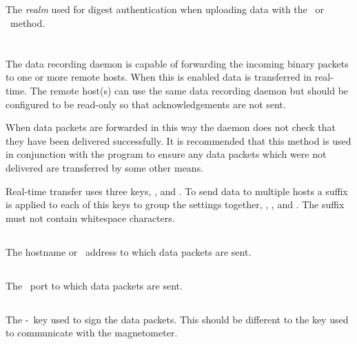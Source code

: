 \subsection{}
The \emph{realm} used for digest authentication when uploading data
with the \http\ or \https\ method.

\section{}

The data recording daemon is capable of forwarding the incoming binary
packets to one or more remote hosts. When this is enabled data is
transferred in real-time. The remote host(s) can use the same data
recording daemon but should be configured to be read-only so that
acknowledgements are not sent.

When data packets are forwarded in this way the daemon does not check
that they have been delivered successfully. It is recommended that
this method is used in conjunction with the 
program to ensure any data packets which were not delivered are
transferred by some other means.

Real-time transfer uses three keys, ,
 and . To send data to multiple
hosts a suffix is applied to each of this keys to group the settings
together, \eg, ,  and
. The suffix must not contain whitespace characters.

\subsection{}
The hostname or \ip\ address to which data packets are sent.

\subsection{}
The \udp\ port to which data packets are sent.

\subsection{}
The \hmac-\mdfive\ key used to sign the data packets. This should be
different to the key used to communicate with the magnetometer.

\section{\code{[dataqualitymonitor]}}

